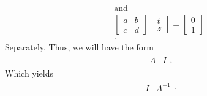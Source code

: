 \documentclass{report}
\begin{document}
\begin{itemize}
\begin{align*}
                    \text{and} \\
                    \begin{bmatrix} a & b \\ c & d \end{bmatrix} \begin{bmatrix} t \\ z \end{bmatrix} = \begin{bmatrix} 0 \\ 1 \end{bmatrix} \\
                .\end{align*}
                Separately. Thus, we will have the form
                \begin{align*}
                    \begin{array}{c|c}
                        A & I 
                    \end{array}
                .\end{align*}
                Which yields
                \begin{align*}
                     \begin{array}{c|c}
                         I & A^{-1}
                    \end{array}
                .\end{align*}



\end{itemize}
\end{document}
